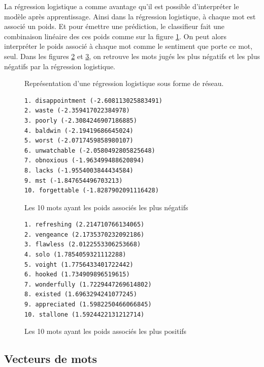 \documentclass{article}
\begin{document}
La régression logistique a comme avantage qu'il est possible d'interpréter le modèle après apprentissage. Ainsi dans la régression logistique, à chaque mot est associé un poids. Et pour émettre une prédiction, le classifieur fait une combinaison linéaire des ces poids comme sur la figure \ref{lr_net}. On peut alors interpréter le poids associé à chaque mot comme le sentiment que porte ce mot, seul. Dans les figures \ref{negative} et \ref{positive}, on retrouve les mots jugés les plus négatifs et les plus négatifs par la régression logistique.

\begin{figure}[h]
\begin{center}

\end{center}
\caption{Représentation d'une régression logistique sous forme de réseau.}
\label{lr_net}
\end{figure}


\begin{figure}[h][h]
\begin{verbatim}
1. disappointment (-2.608113025883491)
2. waste (-2.359417022384978)
3. poorly (-2.3084246907186885)
4. baldwin (-2.19419686645024)
5. worst (-2.0717459858980107)
6. unwatchable (-2.0580492805825648)
7. obnoxious (-1.963499488620894)
8. lacks (-1.9554003844434584)
9. mst (-1.847654496703213)
10. forgettable (-1.8287902091116428)
\end{verbatim}
\caption{Les 10 mots ayant les poids associés les plus négatifs}
\label{negative}
\end{figure}

\begin{figure}[h][h]
\begin{verbatim}
1. refreshing (2.214710766134065)
2. vengeance (2.1735370232092186)
3. flawless (2.0122553306253668)
4. solo (1.7854059321112288)
5. voight (1.7756433401722442)
6. hooked (1.734909896519615)
7. wonderfully (1.7229447269614802)
8. existed (1.6963294241077245)
9. appreciated (1.5982250466066845)
10. stallone (1.5924422131212714)
\end{verbatim}
\caption{Les 10 mots ayant les poids associés les plus positifs}
\label{positive}
\end{figure}

\subsection{Vecteurs de mots}
\end{document}
